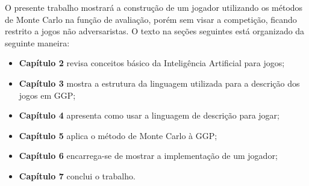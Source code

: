 O presente trabalho mostrará a construção de um jogador utilizando os métodos de Monte Carlo na função de avaliação, porém sem visar a competição, ficando restrito a jogos não adversaristas. O texto na seções seguintes está organizado da seguinte maneira: 
\begin{itemize}
	\item \textbf{Capítulo 2} revisa conceitos básico da Inteligência Artificial para jogos; 
	\item \textbf{Capítulo 3} mostra a estrutura da linguagem utilizada para a descrição dos jogos em GGP;
	\item \textbf{Capítulo 4} apresenta como usar a linguagem de descrição para jogar;
	\item \textbf{Capítulo 5} aplica o método de Monte Carlo à GGP;
	\item \textbf{Capítulo 6} encarrega-se de mostrar a implementação de um  jogador;
	\item \textbf{Capítulo 7} conclui o trabalho.
\end{itemize}